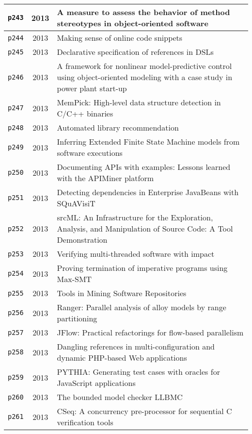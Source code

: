 \begin{longtable}{| c | c | p{16cm} |}
  \hline
  \texttt{p243} & 2013 & A measure to assess the behavior of method stereotypes in object-oriented software \\
  \hline
  \texttt{p244} & 2013 & Making sense of online code snippets \\
  \hline
  \texttt{p245} & 2013 & Declarative specification of references in DSLs \\
  \hline
  \texttt{p246} & 2013 & A framework for nonlinear model-predictive control using object-oriented modeling with a case study in power plant start-up \\
  \hline
  \texttt{p247} & 2013 & MemPick: High-level data structure detection in C/C++ binaries \\
  \hline
  \texttt{p248} & 2013 & Automated library recommendation \\
  \hline
  \texttt{p249} & 2013 & Inferring Extended Finite State Machine models from software executions \\
  \hline
  \texttt{p250} & 2013 & Documenting APIs with examples: Lessons learned with the APIMiner platform \\
  \hline
  \texttt{p251} & 2013 & Detecting dependencies in Enterprise JavaBeans with SQuAVisiT \\
  \hline
  \texttt{p252} & 2013 & srcML: An Infrastructure for the Exploration, Analysis, and Manipulation of Source Code: A Tool Demonstration \\
  \hline
  \texttt{p253} & 2013 & Verifying multi-threaded software with impact \\
  \hline
  \texttt{p254} & 2013 & Proving termination of imperative programs using Max-SMT \\
  \hline
  \texttt{p255} & 2013 & Tools in Mining Software Repositories \\
  \hline
  \texttt{p256} & 2013 & Ranger: Parallel analysis of alloy models by range partitioning \\
  \hline
  \texttt{p257} & 2013 & JFlow: Practical refactorings for flow-based parallelism \\
  \hline
  \texttt{p258} & 2013 & Dangling references in multi-configuration and dynamic PHP-based Web applications \\
  \hline
  \texttt{p259} & 2013 & PYTHIA: Generating test cases with oracles for JavaScript applications \\
  \hline
  \texttt{p260} & 2013 & The bounded model checker LLBMC \\
  \hline
  \texttt{p261} & 2013 & CSeq: A concurrency pre-processor for sequential C verification tools \\

\end{longtable}
